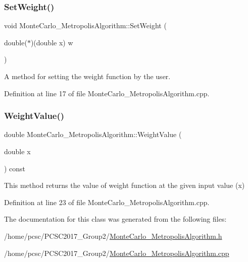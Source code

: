 \mbox{\label{class_monte_carlo___metropolis_algorithm_a46da0258439fd525ff6c93a4571c08dd}} 
\subsubsection{\texorpdfstring{Set\+Weight()}{SetWeight()}}
{\footnotesize\ttfamily void Monte\+Carlo\+\_\+\+Metropolis\+Algorithm\+::\+Set\+Weight (\begin{DoxyParamCaption}\item[{double($\ast$)(double x)}]{w }\end{DoxyParamCaption})}



A method for setting the weight function by the user. 



Definition at line 17 of file Monte\+Carlo\+\_\+\+Metropolis\+Algorithm.\+cpp.

\mbox{\label{class_monte_carlo___metropolis_algorithm_a5295f6e5691292d833da48105b13ece4}} 
\subsubsection{\texorpdfstring{Weight\+Value()}{WeightValue()}}
{\footnotesize\ttfamily double Monte\+Carlo\+\_\+\+Metropolis\+Algorithm\+::\+Weight\+Value (\begin{DoxyParamCaption}\item[{double}]{x }\end{DoxyParamCaption}) const}



This method returns the value of weight function at the given input value (x) 



Definition at line 23 of file Monte\+Carlo\+\_\+\+Metropolis\+Algorithm.\+cpp.



The documentation for this class was generated from the following files\+:\begin{DoxyCompactItemize}
\item 
/home/pcsc/\+P\+C\+S\+C2017\+\_\+\+Group2/\hyperlink{_monte_carlo___metropolis_algorithm_8h}{Monte\+Carlo\+\_\+\+Metropolis\+Algorithm.\+h}\item 
/home/pcsc/\+P\+C\+S\+C2017\+\_\+\+Group2/\hyperlink{_monte_carlo___metropolis_algorithm_8cpp}{Monte\+Carlo\+\_\+\+Metropolis\+Algorithm.\+cpp}\end{DoxyCompactItemize}
